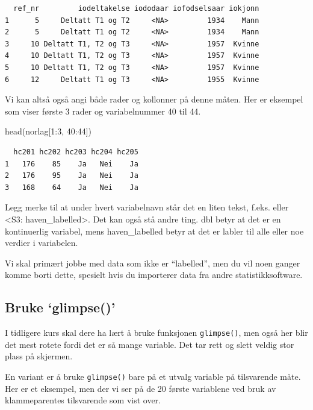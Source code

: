 \documentclass[
  letterpaper,
  DIV=11,
  numbers=noendperiod]{scrreprt}
\newenvironment{Shaded}{\begin{snugshade}}{\end{snugshade}}
\newcommand{\DecValTok}[1]{\textcolor[rgb]{0.68,0.00,0.00}{#1}}
\newcommand{\FunctionTok}[1]{\textcolor[rgb]{0.28,0.35,0.67}{#1}}
\newcommand{\NormalTok}[1]{\textcolor[rgb]{0.00,0.23,0.31}{#1}}
\newcommand{\SpecialCharTok}[1]{\textcolor[rgb]{0.37,0.37,0.37}{#1}}
\theoremstyle{definition}
\theoremstyle{remark}
\begin{document}
\begin{verbatim}
  ref_nr         iodeltakelse iododaar iofodselsaar iokjonn
1      5     Deltatt T1 og T2     <NA>         1934    Mann
2      5     Deltatt T1 og T2     <NA>         1934    Mann
3     10 Deltatt T1, T2 og T3     <NA>         1957  Kvinne
4     10 Deltatt T1, T2 og T3     <NA>         1957  Kvinne
5     10 Deltatt T1, T2 og T3     <NA>         1957  Kvinne
6     12     Deltatt T1 og T3     <NA>         1955  Kvinne
\end{verbatim}

Vi kan altså også angi både rader og kollonner på denne måten. Her er
eksempel som viser første 3 rader og variabelnummer 40 til 44.

\begin{Shaded}
\begin{Highlighting}[]
\FunctionTok{head}\NormalTok{(norlag[}\DecValTok{1}\SpecialCharTok{:}\DecValTok{3}\NormalTok{, }\DecValTok{40}\SpecialCharTok{:}\DecValTok{44}\NormalTok{])}
\end{Highlighting}
\end{Shaded}

\begin{verbatim}
  hc201 hc202 hc203 hc204 hc205
1   176    85    Ja   Nei    Ja
2   176    95    Ja   Nei    Ja
3   168    64    Ja   Nei    Ja
\end{verbatim}

Legg merke til at under hvert variabelnavn står det en liten tekst,
f.eks. eller \textless S3: haven\_labelled\textgreater. Det kan også stå
andre ting. dbl betyr at det er en kontinuerlig variabel, mens
haven\_labelled betyr at det er labler til alle eller noe verdier i
variabelen.

Vi skal primært jobbe med data som ikke er ``labelled'', men du vil noen
ganger komme borti dette, spesielt hvis du importerer data fra andre
statistikksoftware.

\hypertarget{bruke-glimpse}{%
\subsection{Bruke `glimpse()'}\label{bruke-glimpse}}

I tidligere kurs skal dere ha lært å bruke funksjonen
\texttt{glimpse()}, men også her blir det mest rotete fordi det er så
mange variable. Det tar rett og slett veldig stor plass på skjermen.

En variant er å bruke \texttt{glimpse()} bare på et utvalg variable på
tilsvarende måte. Her er et eksempel, men der vi ser på de 20 første
variablene ved bruk av klammeparentes tilsvarende som vist over.
\end{document}
